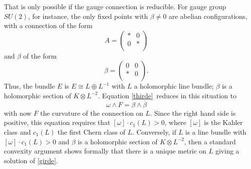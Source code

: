 \documentclass[12pt]{article}
\numberwithin{equation}{section}
\def\bar{\overline}
\begin{document}
That is only possible if the gauge connection is reducible.
For gauge group $SU(2)$, for instance, the only fixed points with
$\beta\not=0$ are abelian
configurations, with a connection of the form
\begin{equation}
  \label{jin}
  A=
  \begin{pmatrix}* & 0 \\ 0 & * \\
  \end{pmatrix}
\end{equation}
and $\beta $ of the form
\begin{equation}
  \label{bbeta}
  \beta =
  \begin{pmatrix} 0 & 0 \\ * & 0 \\
  \end{pmatrix}.
\end{equation}
Thus, the bundle $E$ is $E\cong L \oplus L^{-1}$ with $L$
a holomorphic line bundle; $\beta$ is a holomorphic section
of $K\otimes L^{-2}$.
Equation \eqref{thirde}\ reduces in this situation
to
\begin{equation}
  \label{girde}
  \omega\wedge F=\beta\wedge \bar\beta
\end{equation}
with now $F$ the curvature of the connection on $L$.
Since the right hand side is positive, this equation requires
that $[\omega]\cdot c_1(L)>0$, where $[\omega]$ is the Kahler class
and $c_1(L)$ the first Chern class of $L$.  Conversely, if $L$
is a line bundle with $[\omega]\cdot c_1(L)>0$ and $\beta$ is
a holomorphic section of $K\otimes L^{-2}$, then a standard convexity
argument shows formally
that there is a unique metric on $L$ giving a solution of
\eqref{girde}.
\end{document}
